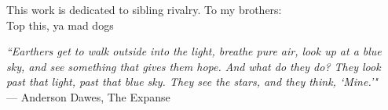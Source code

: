 \newpage\thispagestyle{empty}\mbox{}\newpage
\thispagestyle{empty}
\begin{center}
    \vspace*{5cm}

    This work is dedicated to sibling rivalry. To my brothers: \\
    Top this, ya mad dogs
    
\end{center}
\newpage

\thispagestyle{empty}
\begin{center}
    \vspace*{5cm}




    \emph{“Earthers get to walk outside into the light, breathe pure air, look up at a blue sky, and see something that gives them hope. And what do they do? They look past that light, past that blue sky. They see the stars, and they think, `Mine.'"} \\
    \vspace{0.5cm}--- Anderson Dawes, The Expanse
    
\end{center}